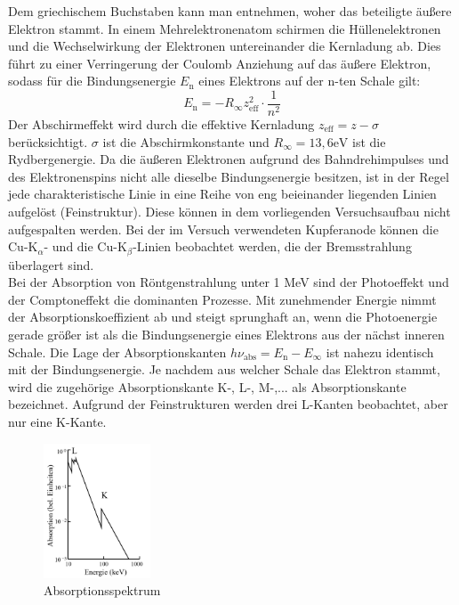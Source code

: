 Dem griechischem Buchstaben kann man entnehmen, woher das beteiligte äußere Elektron stammt.
In einem Mehrelektronenatom schirmen die Hüllenelektronen und die Wechselwirkung der Elektronen untereinander die Kernladung ab.
Dies führt zu einer Verringerung der Coulomb Anziehung auf das äußere Elektron, sodass für die Bindungsenergie $E_\text{n}$ eines Elektrons auf der n-ten Schale gilt:
\begin{equation}
    E_\text{n} = -R_{\infty}z_{\text{eff}}^2 \cdot \frac{1}{n^2}
    \label{eqn:gl2}
\end{equation}
Der Abschirmeffekt wird durch die effektive Kernladung $z_{\text{eff}} = z - \sigma$ berücksichtigt.
$\sigma$ ist die Abschirmkonstante und $R_{\infty} = 13,6 \text{eV}$ ist die Rydbergenergie.
Da die äußeren Elektronen aufgrund des Bahndrehimpulses und des Elektronenspins nicht alle dieselbe Bindungsenergie besitzen, ist in der Regel jede charakteristische Linie in eine Reihe von eng beieinander liegenden Linien aufgelöst (Feinstruktur).
Diese können in dem vorliegenden Versuchsaufbau nicht aufgespalten werden.
Bei der im Versuch verwendeten Kupferanode können die $\text{Cu-K}_{\alpha}\text{- und die Cu-K}_{\beta}\text{-Linien}$ beobachtet werden, die der Bremsstrahlung überlagert sind.\\
\noindent
Bei der Absorption von Röntgenstrahlung unter 1 MeV sind der Photoeffekt und der Comptoneffekt die dominanten Prozesse.
Mit zunehmender Energie nimmt der Absorptionskoeffizient ab und steigt sprunghaft an, wenn die Photoenergie gerade größer ist als die Bindungsenergie eines Elektrons aus der nächst inneren Schale.
Die Lage der Absorptionskanten $h \nu_{\text{abs}} = E_{\text{n}} - E_{\infty}$ ist nahezu identisch mit der Bindungsenergie.
Je nachdem aus welcher Schale das Elektron stammt, wird die zugehörige Absorptionskante K-, L-, M-,... als Absorptionskante bezeichnet.
Aufgrund der Feinstrukturen werden drei L-Kanten beobachtet, aber nur eine K-Kante.
\begin{figure}
    \centering
    \includegraphics[height=4.0cm]{data/abb2.jpg}
    \caption{Absorptionsspektrum \cite{V602}}
    \label{fig:abb2}
\end{figure} \\
